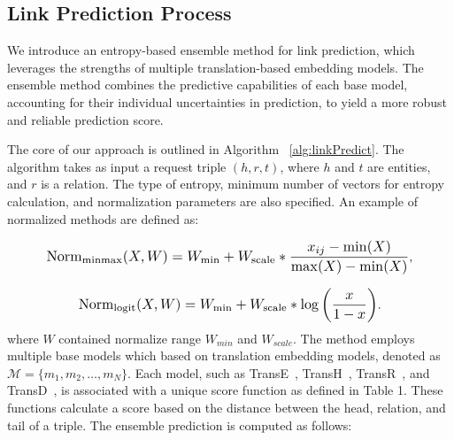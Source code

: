 \documentclass{article}
\begin{document}


\subsection{Link Prediction Process}

We introduce an entropy-based ensemble method for link prediction, which leverages the strengths of multiple translation-based embedding models. The ensemble method combines the predictive capabilities of each base model, accounting for their individual uncertainties in prediction, to yield a more robust and reliable prediction score. 

The core of our approach is outlined in Algorithm ~\ref{alg:linkPredict}. The algorithm takes as input a request triple $(h, r, t)$, where $h$ and $t$ are entities, and $r$ is a relation. The type of entropy, minimum number of vectors for entropy calculation, and normalization parameters are also specified. An example of normalized methods are defined as:

\begin{equation}
    \label{eq:NormMM}
    \resizebox{.85\linewidth}{!}{$
            \displaystyle
            \text{Norm}_{\text{minmax}}(X, W) = W_{\text{min}} + W_{\text{scale}}*\frac{x_{ij} - \min(X)}{\max(X) - \min(X)}            
        $},
\end{equation}

\begin{equation}
    \resizebox{.70\linewidth}{!}{$
            \displaystyle
            \text{Norm}_{\text{logit}}(X, W) =  W_{\text{min}} + W_{\text{scale}}*\log\left(\frac{x}{1 - x}\right)
        $}.
\end{equation} where $W$ contained normalize range $W_{min}$ and $W_{scale}$. The method employs multiple base models which based on translation embedding models, denoted as $\mathcal{M} = \{m_1, m_2, \ldots, m_N\}$. Each model, such as TransE~\cite{bordes2013translating}, TransH~\cite{wang2014knowledge}, TransR~\cite{lin2015learning}, and TransD~\cite{ji2015knowledge}, is associated with a unique score function as defined in Table 1. These functions calculate a score based on the distance between the head, relation, and tail of a triple. The ensemble prediction is computed as follows:
\end{document}
